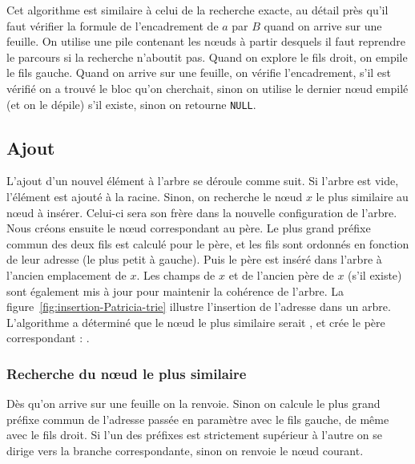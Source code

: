 Cet algorithme est similaire à celui de la recherche exacte, au détail près
qu'il faut vérifier la formule de l'encadrement de $a$ par $B$ quand on arrive
sur une feuille.
On utilise une pile contenant les n\oe{}uds à partir desquels il faut reprendre
le parcours si la recherche n'aboutit pas.
Quand on explore le fils droit, on empile le fils gauche.
Quand on arrive sur une feuille, on vérifie l'encadrement, s'il est vérifié on
a trouvé le bloc qu'on cherchait, sinon on utilise le dernier n\oe{}ud empilé
(et on le dépile) s'il existe, sinon on retourne \lstinline{NULL}.

\subsection{Ajout}






L'ajout d'un nouvel élément à l'arbre se déroule comme suit. Si l'arbre est
vide, l'élément est ajouté à la racine.
Sinon, on recherche le n\oe{}ud $x$ le plus similaire au n\oe{}ud à insérer.
Celui-ci sera son frère dans la nouvelle configuration de l'arbre.
Nous créons ensuite le n\oe{}ud correspondant au père.
Le plus grand préfixe commun des deux fils est calculé pour le père, et les fils
sont ordonnés en fonction de leur adresse (le plus petit à gauche).
Puis le père est inséré dans l'arbre à l'ancien emplacement de $x$.
Les champs de $x$ et de l'ancien père de $x$ (s'il existe) sont également mis à
jour pour maintenir la cohérence de l'arbre.
La figure~\ref{fig:insertion-Patricia-trie} illustre l'insertion de l'adresse
 dans un arbre.
L'algorithme a déterminé que le n\oe{}ud le plus similaire serait
, et crée le père correspondant :
.


\subsubsection*{Recherche du n\oe{}ud le plus similaire}


Dès qu'on arrive sur une feuille on la renvoie.
Sinon on calcule le plus grand préfixe commun de l'adresse passée en paramètre
avec le fils gauche, de même avec le fils droit.
Si l'un des préfixes est strictement supérieur à l'autre on se dirige vers la
branche correspondante, sinon on renvoie le n\oe{}ud courant.



